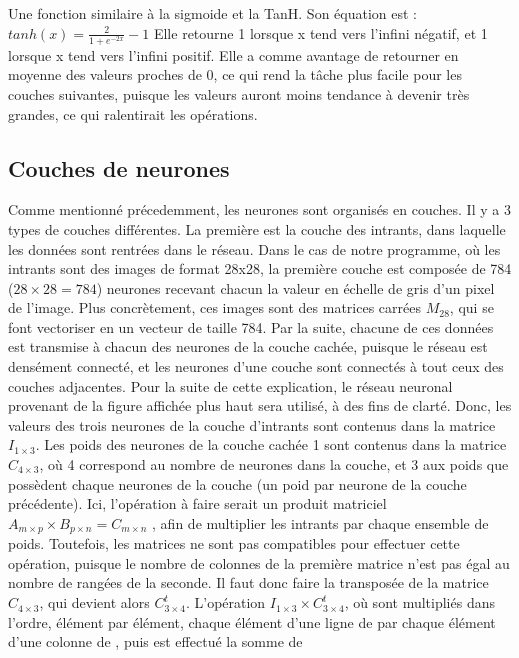 \documentclass[letterpaper,10pt,french]{sphinxmanual}
\begin{document}
Une fonction similaire à la sigmoide et la TanH. Son équation est :
\( tanh(x) = 
\frac{2}{1 + e^{-2x}} - 1
\)
Elle retourne \sphinxhyphen{}1 lorsque x tend vers l’infini négatif, et 1 lorsque x tend vers l’infini positif. Elle a comme avantage de retourner en moyenne
des valeurs proches de 0, ce qui rend la tâche plus facile pour les couches suivantes, puisque les valeurs auront moins tendance à devenir très grandes,
ce qui ralentirait les opérations.


\subsection{Couches de neurones}
\label{\detokenize{notions_de_base:couches-de-neurones}}
Comme mentionné précedemment, les neurones sont organisés en couches. Il y a 3 types de couches différentes. La première est la couche des intrants, dans laquelle
les données sont rentrées dans le réseau. Dans le cas de notre programme, où les intrants sont des images de format 28x28,
la première couche est composée de 784 (\(28\times28 = 784\)) neurones recevant chacun la valeur en échelle de gris d’un pixel de l’image.
Plus concrètement, ces images sont des matrices carrées \(M_{28}\), qui se font vectoriser en un vecteur de taille 784. Par la suite, chacune de ces
données est transmise à chacun des neurones de la couche cachée, puisque le réseau est densément connecté, et les neurones d’une couche sont connectés à
tout ceux des couches adjacentes. Pour la suite de cette explication, le réseau neuronal provenant de la figure affichée plus haut sera utilisé, à des
fins de clarté. Donc, les valeurs des trois neurones de la couche d’intrants sont contenus dans la matrice \(I_{1\times3}\). Les poids des neurones de la couche cachée 1 sont
contenus dans la matrice \(C_{4\times3}\), où 4 correspond au nombre de neurones dans la couche, et 3 aux poids que possèdent chaque neurones de la couche (un poid par neurone
de la couche précédente). Ici, l’opération à faire serait un produit matriciel
\(A_{m\times p} \times B_{p\times n} = C_{m\times n}\)
, afin de multiplier les intrants par chaque ensemble de poids. Toutefois, les matrices ne sont
pas compatibles pour effectuer cette opération, puisque le nombre de colonnes de la première matrice n’est pas égal au nombre de rangées de la seconde.
Il faut donc faire la transposée de la matrice \(C_{4\times3}\), qui devient alors \(C_{3\times4}^{t}\). L’opération \(I_{1\times3} \times C_{3\times4}^{t}\), où sont multipliés
dans l’ordre, élément par élément, chaque élément d’une ligne de  par chaque élément d’une colonne de , puis est effectué la somme de
\end{document}
